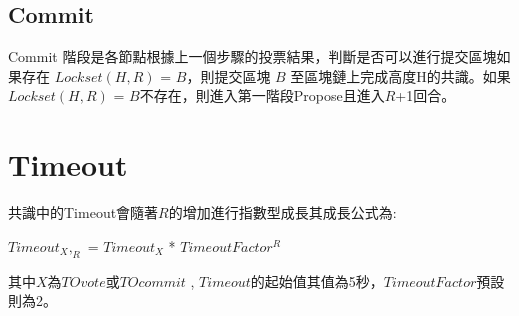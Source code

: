 \subsection{Commit}\label{se_3}
Commit 階段是各節點根據上一個步驟的投票結果，判斷是否可以進行提交區塊如果存在 $Lockset(H, R)$ = $B$，則提交區塊 $B$ 至區塊鏈上完成高度H的共識。如果 $Lockset(H, R)$ = $B$不存在，則進入第一階段Propose且進入$R$+1回合。

\section{Timeout}\label{se_3}

共識中的Timeout會隨著$R$的增加進行指數型成長其成長公式為: 

$Timeout_X,_R$ = $Timeout_X$ * $TimeoutFactor^R$

其中$X$為$TOvote$或$TOcommit$ , $Timeout$的起始值其值為5秒，$TimeoutFactor$預設則為2。 


